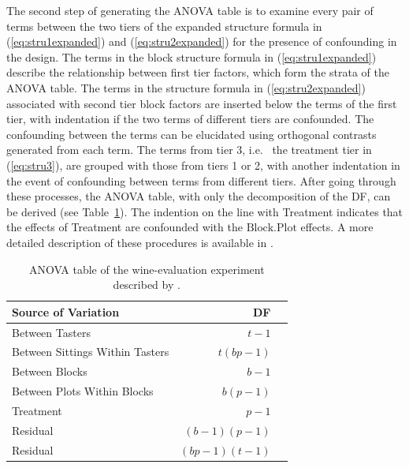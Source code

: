 The second step of generating the ANOVA table is to examine every pair of terms between the two tiers of the expanded structure formula in (\ref{eq:stru1expanded}) and (\ref{eq:stru2expanded}) for the presence of confounding in the design. The terms in the block structure formula in (\ref{eq:stru1expanded}) describe the relationship between first tier factors, which form the strata of the ANOVA table. The terms in the structure formula in (\ref{eq:stru2expanded}) associated with second tier block factors are inserted below the terms of the first tier, with indentation if the two terms of different tiers are confounded. The confounding between the terms can be elucidated using orthogonal contrasts generated from each term. The terms from tier 3, i.e. \ the treatment tier in (\ref{eq:stru3}), are grouped with those from tiers 1 or 2, with another indentation in the event of confounding between terms from different tiers. After going through these processes, the ANOVA table, with only the decomposition of the DF, can be derived (see Table~\ref{tab:Brien1983}). The indention on the line with Treatment indicates that the effects of Treatment are confounded with the $\mathrm{Block.Plot}$ effects. A more detailed description of these procedures is available in \cite{Brien1983}.

\begin{table}[ht]
\centering
\caption{ANOVA table of the wine-evaluation experiment described by \cite{Brien1983}.}
\begin{tabular}{lrl} 
\toprule 
\multicolumn{1}{l}{\textbf{Source of Variation}} & \multicolumn{1}{r}{\textbf{DF}} \\ 
\midrule 
Between Tasters & $t-1$  \\ 
Between Sittings Within Tasters & $t(bp-1)$ \\  
\quad Between Blocks  & $b-1$  \\ 
\quad Between Plots Within Blocks & $b(p-1)$ \\ 
\quad \quad Treatment & $p-1$  \\ 
\quad \quad Residual & $(b-1)(p-1)$ \\ 
\quad Residual & $(bp-1)(t-1)$ \\ 
\bottomrule 
\end{tabular}
\label{tab:Brien1983} 
\end{table} 



